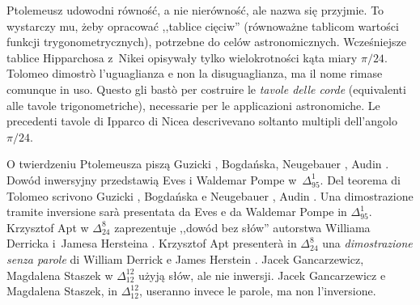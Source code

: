 Ptolemeusz udowodni równość, a nie nierówność, ale nazwa się przyjmie. %
To wystarczy mu, żeby opracować ,,tablice cięciw'' (równoważne tablicom wartości funkcji trygonometrycznych), potrzebne do celów astronomicznych. %
Wcześniejsze tablice Hipparchosa z~Nikei opisywały tylko wielokrotności kąta miary $\pi/24$. %
Tolomeo dimostrò l'uguaglianza e non la disuguaglianza, ma il nome rimase comunque in uso. %
Questo gli bastò per costruire le \emph{tavole delle corde} (equivalenti alle tavole trigonometriche), necessarie per le applicazioni astronomiche. %
Le precedenti tavole di Ipparco di Nicea descrivevano soltanto multipli dell'angolo $\pi/24$. %

O twierdzeniu Ptolemeusza piszą Guzicki \cite[s. 378-379, 407-419]{guzicki_2021}, Bogdańska, Neugebauer \cite[s. 62, 63, 103]{neugebauer_2018}, Audin \cite[s. 108]{audin_2003}. %
Dowód inwersyjny przedstawią Eves \cite[s. 132]{eves1_1972} i Waldemar Pompe w~$\Delta_{95}^1$. %
Del teorema di Tolomeo scrivono Guzicki \cite[p. 378-379, 407-419]{guzicki_2021}, Bogdańska e Neugebauer \cite[p. 62, 63, 103]{neugebauer_2018}, Audin \cite[p. 108]{audin_2003}. %
Una dimostrazione tramite inversione sarà presentata da Eves \cite[p. 132]{eves1_1972} e da Waldemar Pompe in $\Delta_{95}^1$. %
%
Krzysztof Apt w $\Delta_{24}^8$ zaprezentuje ,,dowód bez słów'' autorstwa Williama Derricka i~Jamesa Hersteina \cite{derrick_2012}. %
Krzysztof Apt presenterà in $\Delta_{24}^8$ una \emph{dimostrazione senza parole} di William Derrick e James Herstein \cite{derrick_2012}. %
%
%
Jacek Gancarzewicz, Magdalena Staszek w $\Delta_{12}^{12}$ użyją słów, ale nie inwersji. %
Jacek Gancarzewicz e Magdalena Staszek, in $\Delta_{12}^{12}$, useranno invece le parole, ma non l'inversione. %

